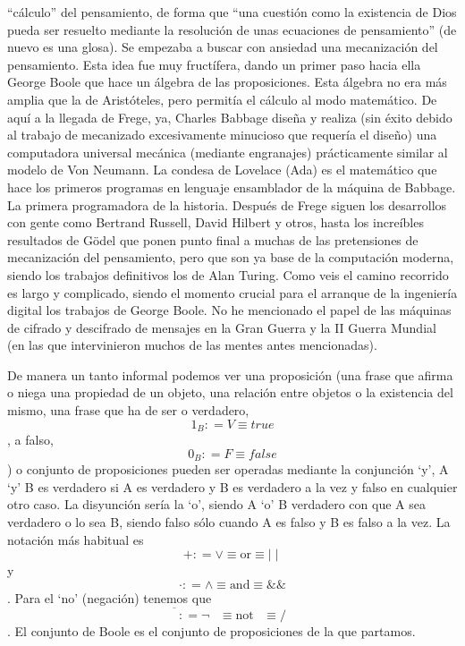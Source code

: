 \begin{enumerate}
  ``cálculo'' del pensamiento, de forma que ``una cuestión como la
  existencia de Dios pueda ser resuelto mediante la resolución de unas
  ecuaciones de pensamiento'' (de nuevo es una glosa). Se empezaba a
  buscar con ansiedad una mecanización del pensamiento. Esta idea fue
  muy fructífera, dando un primer paso hacia ella George Boole que hace
  un ál\-gebra de las proposiciones. Esta álgebra no era más amplia que
  la de Aristóteles, pero permitía el cálculo al modo matemático. De
  aquí a la llegada de Frege, ya, Charles Babbage diseña y realiza (sin
  éxito debido al trabajo de mecanizado ex\-cesivamente minucioso que
  requería el diseño) una computadora universal me\-cánica (mediante
  engranajes) prácticamente similar al modelo de Von Neumann. La condesa
  de Lovelace (Ada) es el matemático que hace los primeros progra\-mas
  en lenguaje ensamblador de la máquina de Babbage. La primera
  programa\-dora de la historia. Después de Frege siguen los desarrollos
  con gente como Ber\-trand Russell, David Hilbert y otros, hasta los
  increíbles resultados de Gödel que ponen punto final a muchas de las
  pretensiones de mecanización del pensamiento, pero que son ya base de
  la computación moderna, siendo los trabajos definitivos los de Alan
  Turing. Como veis el camino recorrido es largo y complicado, siendo el
  momento crucial para el arranque de la ingeniería digital los trabajos
  de George Boole. No he mencionado el papel de las máquinas de cifrado
  y descifrado de mensajes en la Gran Guerra y la II Guerra Mundial (en
  las que intervinieron muchos de las mentes antes mencionadas).

  De manera un tanto informal podemos ver una proposición (una frase que
  afirma o niega una propiedad de un objeto, una relación entre objetos
  o la existencia del mismo, una frase que ha de ser o verdadero,
  \[1_{B}{{: = V} \equiv \mathbf{\mathit{true}}}\], a falso,
  \[0_{B}{{: = F} \equiv \mathbf{\mathit{false}}}\]) o conjunto de
  proposiciones pueden ser operadas mediante la conjunción `y', A `y' B
  es verdadero si A es verdadero y B es verdadero a la vez y falso en
  cualquier otro caso. La disyunción sería la `o', siendo A `o' B
  verdadero con que A sea verdadero o lo sea B, siendo falso sólo cuando
  A es falso y B es falso a la vez. La notación más habitual es
  \[{{+ {: = \vee}} \equiv \text{or}} \equiv {\mid \mid}\]y\[{{\cdot {: = \land}} \equiv \text{and}} \equiv {\&\&}\].
  Para el `no' (negación) tenemos
  que\[{{\overline{\phantom{A}}{: = {\neg\phantom{A}}}} \equiv \text{not}}{\phantom{A} \equiv {/\phantom{A}}}\].
  El conjunto de Boole es el conjunto de proposiciones de la que
  partamos.


\end{enumerate}
